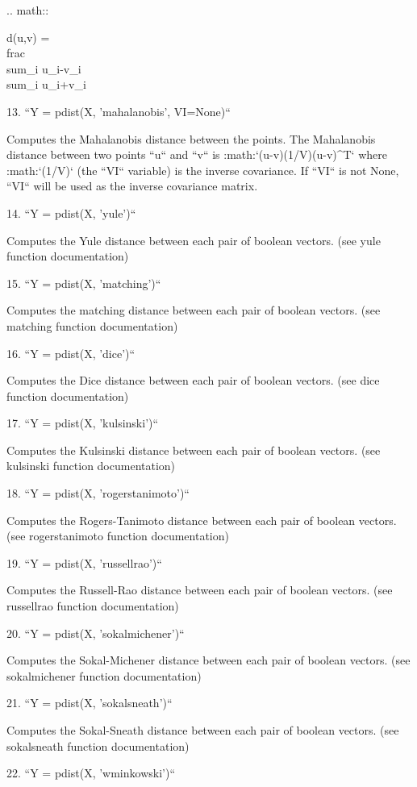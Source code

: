 \begin{DoxyVerb}
   .. math::

        d(u,v) = \\frac{\\sum_i {u_i-v_i}}
                      {\\sum_i {u_i+v_i}}

13. ``Y = pdist(X, 'mahalanobis', VI=None)``

   Computes the Mahalanobis distance between the points. The
   Mahalanobis distance between two points ``u`` and ``v`` is
   :math:`(u-v)(1/V)(u-v)^T` where :math:`(1/V)` (the ``VI``
   variable) is the inverse covariance. If ``VI`` is not None,
   ``VI`` will be used as the inverse covariance matrix.

14. ``Y = pdist(X, 'yule')``

   Computes the Yule distance between each pair of boolean
   vectors. (see yule function documentation)

15. ``Y = pdist(X, 'matching')``

   Computes the matching distance between each pair of boolean
   vectors. (see matching function documentation)

16. ``Y = pdist(X, 'dice')``

   Computes the Dice distance between each pair of boolean
   vectors. (see dice function documentation)

17. ``Y = pdist(X, 'kulsinski')``

   Computes the Kulsinski distance between each pair of
   boolean vectors. (see kulsinski function documentation)

18. ``Y = pdist(X, 'rogerstanimoto')``

   Computes the Rogers-Tanimoto distance between each pair of
   boolean vectors. (see rogerstanimoto function documentation)

19. ``Y = pdist(X, 'russellrao')``

   Computes the Russell-Rao distance between each pair of
   boolean vectors. (see russellrao function documentation)

20. ``Y = pdist(X, 'sokalmichener')``

   Computes the Sokal-Michener distance between each pair of
   boolean vectors. (see sokalmichener function documentation)

21. ``Y = pdist(X, 'sokalsneath')``

   Computes the Sokal-Sneath distance between each pair of
   boolean vectors. (see sokalsneath function documentation)

22. ``Y = pdist(X, 'wminkowski')``


\end{DoxyVerb}
